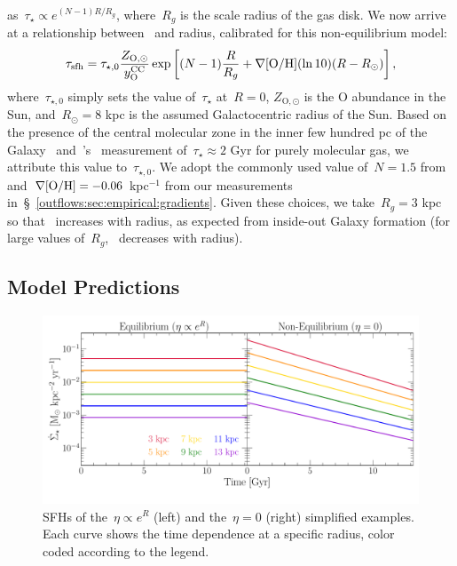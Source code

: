 as~$\tau_\star \propto e^{(N - 1) R / R_g}$, where~$R_g$ is the scale radius of
the gas disk.
We now arrive at a relationship between~ and radius, calibrated
for this non-equilibrium model:
\begin{equation}
\tau_\text{sfh} = \tau_{\star,0} \frac{Z_{\text{O},\odot}}{y_\text{O}^\text{CC}}
\exp\left[(N - 1)\frac{R}{R_g} + \nabla\text{[O/H]} (\ln 10)(R - R_\odot)\right],
\label{outflows:eq:tausfh-radius}
\end{equation}
where~$\tau_{\star,0}$ simply sets the value of~$\tau_\star$ at~$R = 0$,
$Z_{\text{O},\odot}$ is the O abundance in the Sun, and~$R_\odot = 8$ kpc is
the assumed Galactocentric radius of the Sun.
Based on the presence of the central molecular zone in the inner few hundred pc
of the Galaxy~\citep[e.g.,][]{Morris1996, Dahmen1998, PiercePrice2000,
Hatchfield2020} and~\citeauthor{Leroy2008}'s~\citeyearpar{Leroy2008}
measurement of~$\tau_\star \approx 2$ Gyr for purely molecular gas, we
attribute this value to~$\tau_{\star,0}$.
We adopt the commonly used value of~$N = 1.5$ from~\citet{Kennicutt1998}
and~$\nabla\text{[O/H]} = -0.06$ kpc$^{-1}$ from our measurements
in~\S~\ref{outflows:sec:empirical:gradients}.
Given these choices, we take~$R_g = 3$ kpc so that~ increases
with radius, as expected from inside-out Galaxy formation (for large values
of~$R_g$,~ decreases with radius).

\subsection{Model Predictions}
\label{outflows:sec:gce:predictions}

\begin{figure}
\centering
\includegraphics[scale = 0.5]{simplified-examples-sfhs.pdf}
\caption{
SFHs of the~$\eta \propto e^R$ (left) and the~$\eta = 0$ (right) simplified
examples.
Each curve shows the time dependence at a specific radius, color coded
according to the legend.
}
\label{outflows:fig:simplified-examples-sfhs}
\end{figure}

